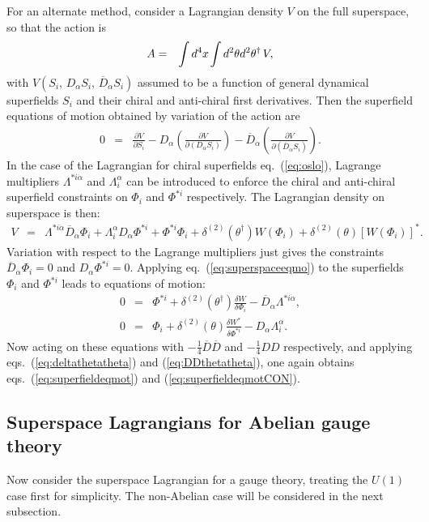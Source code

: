 \documentclass[11pt]{article}
\def\beq{\begin{eqnarray}}
\def\eeq{\end{eqnarray}}
\def\Dcon{\overline D}
\begin{document}
For an alternate method, consider a Lagrangian density $V$ on 
the full superspace, so that the action is
\beq
A &=& \int d^4 x \hspace{-0.5pt} \int d^2\theta d^2\theta^\dagger\, V,
\eeq
with $V(S_i, \, D_\alpha S_i, \, \Dcon_{\dot\alpha} S_i)$ assumed to be
a function of 
general dynamical superfields $S_i$ and their chiral and anti-chiral 
first derivatives. Then the superfield equations of motion obtained by 
variation of the action are
\beq
0 &=& \frac{\partial V}{\partial S_i}
- D_\alpha \left ( \frac{\partial V}{\partial (D_\alpha S_i)} 
\right ) 
- \Dcon_{\dot\alpha} \left (\frac{\partial V}{\partial 
(\Dcon_{\dot\alpha} S_i)} \right )
.
\label{eq:superspaceeqmo}
\eeq
In the case of the Lagrangian for chiral superfields eq.~(\ref{eq:oslo}), 
Lagrange multipliers 
$\Lambda^{*i\dot \alpha}$ and $\Lambda^{\alpha}_i$ can be introduced
to enforce the chiral and anti-chiral superfield constraints 
on $\Phi_i$ and $\Phi^{*i}$ respectively. 
The Lagrangian density on superspace is then:
\beq
V &=& 
\Lambda^{*i\dot \alpha} \Dcon_{\dot \alpha} \Phi_i
+ \Lambda^{\alpha}_i D_{\alpha} \Phi^{*i}
+ \Phi^{*i} \Phi_i 
+ \delta^{(2)}(\theta^\dagger) W(\Phi_i)
+ \delta^{(2)}(\theta) [W(\Phi_i)]^* .
\eeq
Variation with respect to the Lagrange multipliers just gives the 
constraints
$\Dcon_{\dot \alpha} \Phi_i = 0$ and
$D_{\alpha} \Phi^{*i} = 0$. Applying eq.~(\ref{eq:superspaceeqmo}) to the 
superfields $\Phi_i$ and $\Phi^{*i}$ leads to equations of motion:
\beq
0 &=&  
\Phi^{*i} +
\delta^{(2)}(\theta^\dagger) \frac{\delta W}{\delta \Phi_i}
- \Dcon_{\dot\alpha} \Lambda^{*i\dot \alpha},
\\
0 &=& 
\Phi_{i} +
\delta^{(2)}(\theta) \frac{\delta W^*}{\delta \Phi^{*i}}
- D_{\alpha} \Lambda^{\alpha}_i 
.
\eeq
Now acting on these equations 
with $-\frac{1}{4} \Dcon\Dcon$ and
$-\frac{1}{4} DD$ respectively, and applying 
eqs.~(\ref{eq:deltathetatheta}) and (\ref{eq:DDthetatheta}),
one again obtains eqs.~(\ref{eq:superfieldeqmot}) and (\ref{eq:superfieldeqmotCON}).

\subsection{Superspace Lagrangians for Abelian 
gauge theory\label{subsec:superspacelagrabelian}}
\setcounter{equation}{0}
\setcounter{footnote}{2}

Now consider the superspace Lagrangian for a gauge theory, treating the 
$U(1)$ case first for simplicity. The non-Abelian case will be considered 
in the next subsection.
\end{document}
